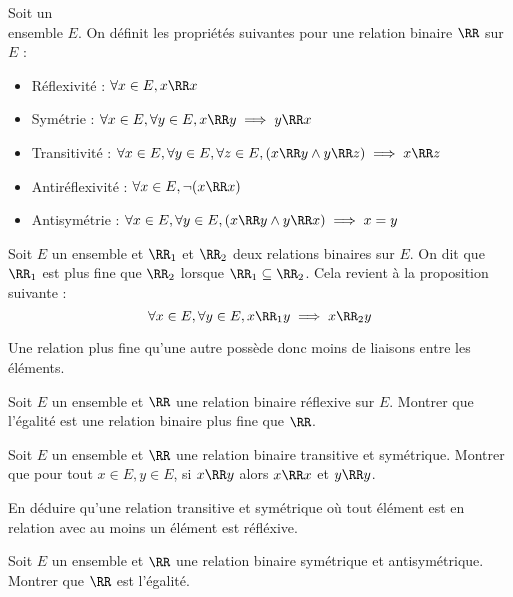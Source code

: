 \begin{defi}
    Soit un \\ensemble $E$. On définit les propriétés suivantes pour une relation binaire $\RR$ sur $E$ :
    \begin{itemize}[label =]
        \item Réflexivité : $\forall x\in E, x\RR x$
        \item Symétrie : $\forall x\in E, \forall y\in E, x\RR y \implies y \RR x$
        \item Transitivité : $\forall x \in E, \forall y \in E, \forall z \in E, (x\RR y \land y\RR z)\implies x \RR z$
        \item Antiréflexivité : $\forall x\in E, \lnot (x\RR x)$
        \item Antisymétrie : $\forall x \in E, \forall y \in E, (x\RR y \land y\RR x)\implies x = y$
    \end{itemize}
\end{defi}

\begin{defi}[Finesse]
    Soit $E$ un ensemble et $\RR_1$ et $\RR_2$ deux relations binaires sur $E$. On dit que $\RR_1$ est plus fine que $\RR_2$ lorsque $\RR_1\subseteq \RR_2$. Cela revient à la proposition suivante : $$\forall x \in E, \forall y \in E, x\RR_1 y \implies x \RR_2 y$$
    
    Une relation plus fine qu'une autre possède donc moins de liaisons entre les éléments.
\end{defi}

\begin{exo}
    Soit $E$ un ensemble et $\RR$ une relation binaire réflexive sur $E$. Montrer que l'égalité est une relation binaire plus fine que $\RR$.
\end{exo}

\begin{exo}
    Soit $E$ un ensemble et $\RR$ une relation binaire transitive et symétrique. Montrer que pour tout $x\in E, y\in E$, si $x\RR y$ alors $x\RR x$ et $y\RR y$. 
    
    En déduire qu'une relation transitive et symétrique où tout élément est en relation avec au moins un élément est réfléxive.
\end{exo}

\begin{exo}
    Soit $E$ un ensemble et $\RR$ une relation binaire symétrique et antisymétrique. Montrer que $\RR$ est l'égalité.
\end{exo}

